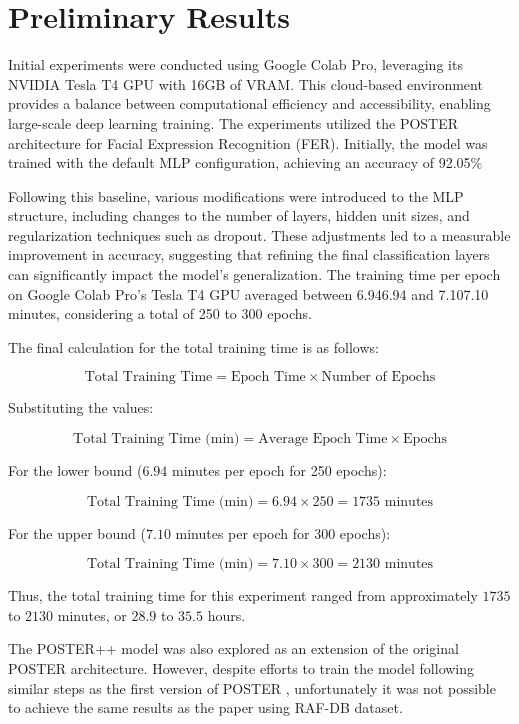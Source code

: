 \chapter{Preliminary Results}
\label{chapter:preliminary-results}

Initial experiments were conducted using Google Colab Pro, leveraging its NVIDIA Tesla T4 GPU with 16GB of VRAM. This cloud-based environment provides a balance between computational efficiency and accessibility, enabling large-scale deep learning training. The experiments utilized the POSTER architecture for Facial Expression Recognition (FER). Initially, the model was trained with the default MLP configuration, achieving an accuracy of 92.05\%

Following this baseline, various modifications were introduced to the MLP structure, including changes to the number of layers, hidden unit sizes, and regularization techniques such as dropout. These adjustments led to a measurable improvement in accuracy, suggesting that refining the final classification layers can significantly impact the model's generalization. The training time per epoch on Google Colab Pro’s Tesla T4 GPU averaged between 6.946.94 and 7.107.10 minutes, considering a total of 250 to 300 epochs.


The final calculation for the total training time is as follows:

$$
\text{Total Training Time} = \text{Epoch Time} \times \text{Number of Epochs}
$$

Substituting the values:

$$
\text{Total Training Time (min)} = \text{Average Epoch Time} \times \text{Epochs}
$$

For the lower bound (\( 6.94 \) minutes per epoch for 250 epochs):

$$
\text{Total Training Time (min)} = 6.94 \times 250 = 1735 \text{ minutes}
$$

For the upper bound (\( 7.10 \) minutes per epoch for 300 epochs):

$$
\text{Total Training Time (min)} = 7.10 \times 300 = 2130 \text{ minutes}
$$

Thus, the total training time for this experiment ranged from approximately \( 1735 \) to \( 2130 \) minutes, or \( 28.9 \) to \( 35.5 \) hours.


The POSTER++ model \cite{mao_poster_2023} was also explored as an extension of the original POSTER architecture. However, despite efforts to train the model following similar steps as the first version of POSTER \cite{zheng_poster_2022}, unfortunately it was not possible to achieve the same results as the paper using RAF-DB dataset. 